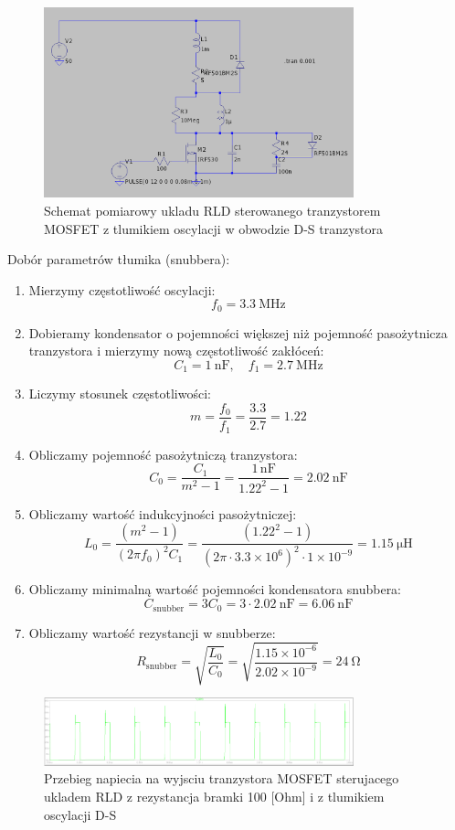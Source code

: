 \documentclass[11pt]{article}
\begin{document}
\begin{figure}[H]
\centering
\includegraphics[width=0.8\textwidth]{aun1_rld_with_snubber.png}
\caption{Schemat pomiarowy ukladu RLD sterowanego tranzystorem MOSFET z tlumikiem oscylacji w obwodzie D-S tranzystora}
\end{figure}

Dobór parametrów tłumika (snubbera):
\begin{enumerate}
  \item Mierzymy częstotliwość oscylacji:
  \[
  f_0 = \SI{3.3}{\mega\hertz}
  \]
  \item Dobieramy kondensator o pojemności większej niż pojemność pasożytnicza tranzystora i mierzymy nową częstotliwość zakłóceń:
  \[
  C_1 = \SI{1}{\nano\farad}, \quad f_1 = \SI{2.7}{\mega\hertz}
  \]
  \item Liczymy stosunek częstotliwości:
  \[
  m = \frac{f_0}{f_1} = \frac{3.3}{2.7} = 1.22
  \]
  \item Obliczamy pojemność pasożytniczą tranzystora:
  \[
  C_0 = \frac{C_1}{m^2 - 1} = \frac{1\,\text{nF}}{1.22^2 - 1} = \SI{2.02}{\nano\farad}
  \]
  \item Obliczamy wartość indukcyjności pasożytniczej:
  \[
  L_0 = \frac{(m^2 - 1)}{(2\pi f_0)^2 C_1} = \frac{(1.22^2 - 1)}{(2\pi \cdot 3.3 \times 10^6)^2 \cdot 1 \times 10^{-9}} = \SI{1.15}{\micro\henry}
  \]
  \item Obliczamy minimalną wartość pojemności kondensatora snubbera:
  \[
  C_{\text{snubber}} = 3C_0 = 3 \cdot \SI{2.02}{\nano\farad} = \SI{6.06}{\nano\farad}
  \]
  \item Obliczamy wartość rezystancji w snubberze:
  \[
  R_{\text{snubber}} = \sqrt{\frac{L_0}{C_0}} = \sqrt{\frac{1.15 \times 10^{-6}}{2.02 \times 10^{-9}}} = \SI{24}{\ohm}
  \]
\end{enumerate}

\begin{figure}[H]
\centering
\includegraphics[width=0.8\textwidth]{aun1_rld_with_snubber_rgate100ohm.png}
\caption{Przebieg napiecia na wyjsciu tranzystora MOSFET sterujacego ukladem RLD z rezystancja bramki 100 [Ohm] i z tlumikiem oscylacji D-S}
\end{figure}
\end{document}
